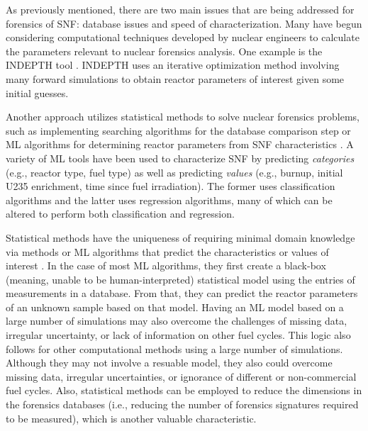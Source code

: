 As previously mentioned, there are two main issues that are being addressed for
forensics of \gls{SNF}: database issues and speed of characterization.  Many
have begun considering computational techniques developed by nuclear engineers
to calculate the parameters relevant to nuclear forensics analysis.  One
example is the \gls{INDEPTH} tool \cite{weber_2006, weber_2010, weber_2011}.
\gls{INDEPTH} uses an iterative optimization method involving many forward
simulations to obtain reactor parameters of interest given some initial
guesses. 

Another approach utilizes statistical methods to solve nuclear forensics
problems, such as implementing searching algorithms for the database comparison
step \cite{gey_search} or \gls{ML} algorithms for determining reactor
parameters from \gls{SNF} characteristics \cite{dayman_feasibility_2013,
nicolaou_2006, nicolaou_2009, nicolaou_2014, robel_2009, pu_discrimination,
jones_viz_2014, jones_snf_2014, mll_method, mll_sensitivity, mll_validate}.
A variety of \gls{ML} tools have been used to characterize \gls{SNF} by
predicting \emph{categories} (e.g., reactor type, fuel type) as well as
predicting \emph{values} (e.g., burnup, initial U235 enrichment, time since
fuel irradiation).  The former uses classification algorithms and the latter
uses regression algorithms, many of which can be altered to perform both
classification and regression. 

Statistical methods have the uniqueness of requiring minimal domain knowledge
via methods or \gls{ML} algorithms that predict the characteristics or values
of interest \cite{dayman_feasibility_2013, pu_discrimination, robel_2009,
nicolaou_2006, nicolaou_2009, nicolaou_2014, jones_snf_2014, jones_viz_2014,
mll_method, mll_sensitivity, mll_validate}.  In the case of most \gls{ML}
algorithms, they first create a black-box (meaning, unable to be
human-interpreted) statistical model using the entries of measurements in a
database. From that, they can predict the reactor parameters of an unknown
sample based on that model.  Having an \gls{ML} model based on a large number
of simulations may also overcome the challenges of missing data, irregular
uncertainty, or lack of information on other fuel cycles.  This logic also
follows for other computational methods using a large number of simulations.
Although they may not involve a resuable model, they also could overcome
missing data, irregular uncertainties, or ignorance of different or
non-commercial fuel cycles.  Also, statistical methods can be employed to
reduce the dimensions in the forensics databases (i.e., reducing the number of
forensics signatures required to be measured), which is another valuable
characteristic.
